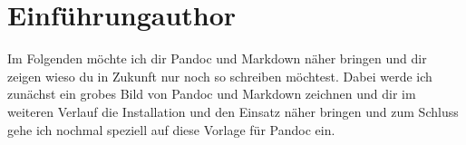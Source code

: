 \documentclass[
    12pt,
    a4paper,
            ngerman,
        bibliography=totocnumbered,
    listof=totocnumbered
]{scrartcl}
\begin{document}

	{
	
	\setcounter{tocdepth}{3}

	\renewcommand{\cfttabpresnum}{Tab. }
	\renewcommand{\cftfigpresnum}{Abb. }
	\settowidth{\cfttabnumwidth}{Abb. 10\quad}
	\settowidth{\cftfignumwidth}{Abb. 10\quad}

	\singlespacing
	\renewcommand{\contentsname}{I Inhaltsverzeichnis}
	\addtocounter{section}{1}
	\tableofcontents
	\pagebreak
	}



\renewcommand{\sectionmark}[1]{\markright{#1}}
\renewcommand{\subsectionmark}[1]{}
\renewcommand{\subsubsectionmark}[1]{}
\rhead{} %

\onehalfspacing
\renewcommand{\thesection}{\arabic{section}}
\renewcommand{\theHsection}{\arabic{section}}
\setcounter{section}{0}
\setcounter{page}{1}

\hypertarget{einfuxfchrungauthor}{%
\section{Einführungauthor}\label{einfuxfchrungauthor}}

Im Folgenden möchte ich dir Pandoc und Markdown näher bringen und dir
zeigen wieso du in Zukunft nur noch so schreiben möchtest. Dabei werde
ich zunächst ein grobes Bild von Pandoc und Markdown zeichnen und dir im
weiteren Verlauf die Installation und den Einsatz näher bringen und zum
Schluss gehe ich nochmal speziell auf diese Vorlage für Pandoc ein.
\end{document}
